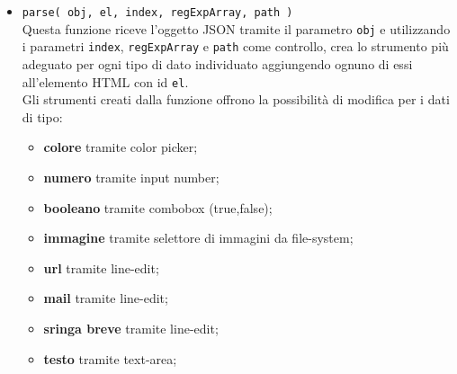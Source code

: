 \begin{itemize}
	\item \texttt{parse( obj, el, index, regExpArray, path )}\\
	Questa funzione riceve l'oggetto JSON tramite il parametro \texttt{obj} e utilizzando i parametri \texttt{index}, \texttt{regExpArray} e \texttt{path} come controllo, crea lo strumento più adeguato per ogni tipo di dato individuato aggiungendo ognuno di essi all'elemento HTML con id \texttt{el}.\\
	Gli strumenti creati dalla funzione offrono la possibilità di modifica per i dati di tipo:
	\begin{itemize}
		\item \textbf{colore} tramite color picker;
		\item \textbf{numero} tramite input number;
		\item \textbf{booleano} tramite combobox (true,false);
		\item \textbf{immagine} tramite selettore di immagini da file-system;
		\item \textbf{url} tramite line-edit;
		\item \textbf{mail} tramite line-edit;
		\item \textbf{sringa breve} tramite line-edit;
		\item \textbf{testo} tramite text-area;
	\end{itemize}
\end{itemize}